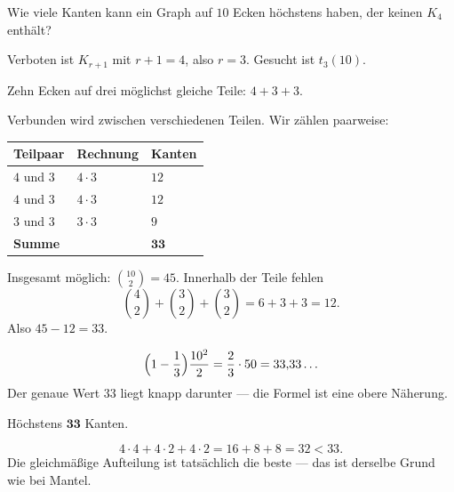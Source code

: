 \begin{aufgabe}
Wie viele Kanten kann ein Graph auf $10$ Ecken höchstens haben, der keinen $K_4$ enthält?

\loesung
{}
Verboten ist $K_{r+1}$ mit $r+1 = 4$, also $r = 3$. Gesucht ist $t_3(10)$.

Zehn Ecken auf drei möglichst gleiche Teile: $4 + 3 + 3$.

Verbunden wird zwischen verschiedenen Teilen. Wir zählen paarweise:
\begin{center}
\renewcommand{\arraystretch}{1.42}
\begin{tabular}{@{}P{2.6cm}P{2.4cm}P{1.8cm}@{}}
\toprule
\textbf{Teilpaar} & \textbf{Rechnung} & \textbf{Kanten}\\
\midrule
$4$ und $3$ & $4 \cdot 3$ & $12$\\
$4$ und $3$ & $4 \cdot 3$ & $12$\\
$3$ und $3$ & $3 \cdot 3$ & $9$\\
\midrule
\textbf{Summe} & & $\mathbf{33}$\\
\bottomrule
\end{tabular}
\end{center}

Insgesamt möglich: $\binom{10}{2} = 45$. Innerhalb der Teile fehlen
\[ \binom{4}{2} + \binom{3}{2} + \binom{3}{2} = 6 + 3 + 3 = 12 . \]
Also $45 - 12 = 33$. \checkmark

\[ \Bigl(1-\frac13\Bigr)\frac{10^2}{2} = \frac23 \cdot 50 = 33{,}33\ldots \]
Der genaue Wert $33$ liegt knapp darunter --- die Formel ist eine obere Näherung. \checkmark

Höchstens $\mathbf{33}$ Kanten.

\[ 4\cdot4 + 4\cdot2 + 4\cdot2 = 16 + 8 + 8 = 32 < 33 . \]
Die gleichmäßige Aufteilung ist tatsächlich die beste --- das ist derselbe Grund wie bei Mantel.
\end{aufgabe}

